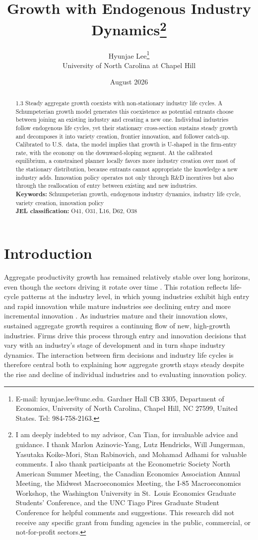 \documentclass[12pt]{article}
\title{Growth with Endogenous Industry Dynamics\thanks{I am deeply indebted to my advisor, Can Tian, for invaluable advice and guidance. I thank Marlon Azinovic-Yang, Lutz Hendricks, Will Jungerman, Yasutaka Koike-Mori, Stan Rabinovich, and Mohamad Adhami for valuable comments. I also thank participants at the Econometric Society North American Summer Meeting, the Canadian Economics Association Annual Meeting, the Midwest Macroeconomics Meeting, the I-85 Macroeconomics Workshop, the Washington University in St.\ Louis Economics Graduate Students' Conference, and the UNC Tiago Pires Graduate Student Conference for helpful comments and suggestions. This research did not receive any specific grant from funding agencies in the public, commercial, or not-for-profit sectors.}}
\author{Hyunjae Lee\thanks{E-mail: hyunjae.lee@unc.edu. Gardner Hall CB 3305, Department of Economics, University of North Carolina, Chapel Hill, NC 27599, United States. Tel: 984-758-2163.}\\[2pt] University of North Carolina at Chapel Hill}
\date{August 2026}
\begin{document}
\maketitle
\vspace{-0.3in}
\begin{abstract}
\begin{spacing}{1.3}
\noindent Steady aggregate growth coexists with non-stationary industry life cycles. A Schumpeterian growth model generates this coexistence as potential entrants choose between joining an existing industry and creating a new one. Individual industries follow endogenous life cycles, yet their stationary cross-section sustains steady growth and decomposes it into variety creation, frontier innovation, and follower catch-up. Calibrated to U.S.\ data, the model implies that growth is U-shaped in the firm-entry rate, with the economy on the downward-sloping segment. At the calibrated equilibrium, a constrained planner locally favors more industry creation over most of the stationary distribution, because entrants cannot appropriate the knowledge a new industry adds. Innovation policy operates not only through R\&D incentives but also through the reallocation of entry between existing and new industries.
\vspace{0.1in}\\
\noindent\textbf{Keywords:} Schumpeterian growth, endogenous industry dynamics, industry life cycle, variety creation, innovation policy
\vspace{0.1in}\\
\noindent\textbf{JEL classification:} O41, O31, L16, D62, O38
\end{spacing}
\end{abstract}
\newpage

\section{Introduction}

Aggregate productivity growth has remained relatively stable over long horizons, even though the sectors driving it rotate over time \citep{FergusonW04,SarteT25}. This rotation reflects life-cycle patterns at the industry level, in which young industries exhibit high entry and rapid innovation while mature industries see declining entry and more incremental innovation \citep{GortK82,AbernathyU78,Klepper96}. As industries mature and their innovation slows, sustained aggregate growth requires a continuing flow of new, high-growth industries. Firms drive this process through entry and innovation decisions that vary with an industry's stage of development and in turn shape industry dynamics. The interaction between firm decisions and industry life cycles is therefore central both to explaining how aggregate growth stays steady despite the rise and decline of individual industries and to evaluating innovation policy.
\end{document}
